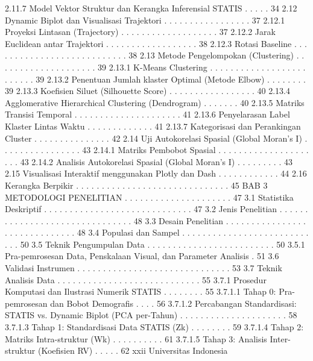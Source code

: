 2.11.7 Model Vektor Struktur dan Kerangka Inferensial STATIS . . . . . 34
2.12 Dynamic Biplot dan Visualisasi Trajektori . . . . . . . . . . . . . . . . . 37
2.12.1 Proyeksi Lintasan (Trajectory) . . . . . . . . . . . . . . . . . . . 37
2.12.2 Jarak Euclidean antar Trajektori . . . . . . . . . . . . . . . . . . 38
2.12.3 Rotasi Baseline . . . . . . . . . . . . . . . . . . . . . . . . . . . 38
2.13 Metode Pengelompokan (Clustering) . . . . . . . . . . . . . . . . . . . . 39
2.13.1 K-Means Clustering . . . . . . . . . . . . . . . . . . . . . . . . . 39
2.13.2 Penentuan Jumlah klaster Optimal (Metode Elbow) . . . . . . . . 39
2.13.3 Koefisien Siluet (Silhouette Score) . . . . . . . . . . . . . . . . . 40
2.13.4 Agglomerative Hierarchical Clustering (Dendrogram) . . . . . . . 40
2.13.5 Matriks Transisi Temporal . . . . . . . . . . . . . . . . . . . . . 41
2.13.6 Penyelarasan Label Klaster Lintas Waktu . . . . . . . . . . . . . 41
2.13.7 Kategorisasi dan Perankingan Cluster . . . . . . . . . . . . . . . 42
2.14 Uji Autokorelasi Spasial (Global Moran’s I) . . . . . . . . . . . . . . . . 43
2.14.1 Matriks Pembobot Spasial . . . . . . . . . . . . . . . . . . . . . 43
2.14.2 Analisis Autokorelasi Spasial (Global Moran’s I) . . . . . . . . . 43
2.15 Visualisasi Interaktif menggunakan Plotly dan Dash . . . . . . . . . . . . 44
2.16 Kerangka Berpikir . . . . . . . . . . . . . . . . . . . . . . . . . . . . . . 45
BAB 3 METODOLOGI PENELITIAN . . . . . . . . . . . . . . . . . . . . . 47
3.1 Statistika Deskriptif . . . . . . . . . . . . . . . . . . . . . . . . . . . . . 47
3.2 Jenis Penelitian . . . . . . . . . . . . . . . . . . . . . . . . . . . . . . . 48
3.3 Desain Penelitian . . . . . . . . . . . . . . . . . . . . . . . . . . . . . . 48
3.4 Populasi dan Sampel . . . . . . . . . . . . . . . . . . . . . . . . . . . . 50
3.5 Teknik Pengumpulan Data . . . . . . . . . . . . . . . . . . . . . . . . . 50
3.5.1 Pra-pemrosesan Data, Penskalaan Visual, dan Parameter Analisis . 51
3.6 Validasi Instrumen . . . . . . . . . . . . . . . . . . . . . . . . . . . . . . 53
3.7 Teknik Analisis Data . . . . . . . . . . . . . . . . . . . . . . . . . . . . 55
3.7.1 Prosedur Komputasi dan Ilustrasi Numerik STATIS . . . . . . . . 55
3.7.1.1 Tahap 0: Pra-pemrosesan dan Bobot Demografis . . . . 56
3.7.1.2 Percabangan Standardisasi: STATIS vs. Dynamic Biplot
(PCA per-Tahun) . . . . . . . . . . . . . . . . . . . . . 58
3.7.1.3 Tahap 1: Standardisasi Data STATIS (Zk) . . . . . . . . 59
3.7.1.4 Tahap 2: Matriks Intra-struktur (Wk) . . . . . . . . . . 61
3.7.1.5 Tahap 3: Analisis Inter-struktur (Koefisien RV) . . . . . 62
xxii Universitas Indonesia

